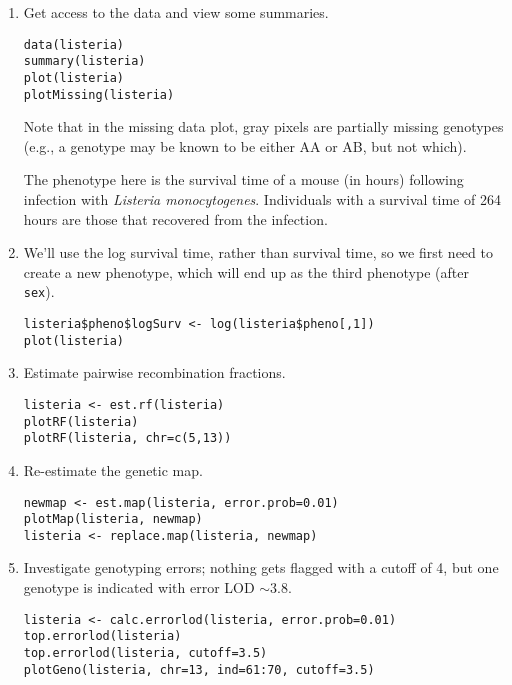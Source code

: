 \documentclass[10pt,letterpaper]{article}
\newcommand{\usercolor}{\color [named]{BlueViolet}}
\begin{document}
\begin{enumerate}
\item Get access to the data and view some summaries.

\usercolor 
\verb|data(listeria)| \\
\verb|summary(listeria)| \\
\verb|plot(listeria)| \\
\verb|plotMissing(listeria)| 
\normalcolor

Note that in the missing data plot, gray pixels are partially missing
genotypes (e.g., a genotype may be known to be either AA or AB, but
not which).

The phenotype here is the survival time of a mouse (in hours)
following infection with \emph{Listeria monocytogenes}.  Individuals
with a survival time of 264 hours are those that recovered from the
infection.

\item We'll use the log survival time, rather than survival time, so
  we first need to create a new phenotype, which will end up as the
  third phenotype (after \verb-sex-).

\usercolor
\verb|listeria$pheno$logSurv <- log(listeria$pheno[,1])| \\ %
\verb|plot(listeria)| \normalcolor

\item Estimate pairwise recombination fractions.

\usercolor \verb|listeria <- est.rf(listeria)| \\
\verb|plotRF(listeria)| \\
\verb|plotRF(listeria, chr=c(5,13))| 
\normalcolor

\item Re-estimate the genetic map. 
 
\usercolor 
\verb|newmap <- est.map(listeria, error.prob=0.01)| \\
\verb|plotMap(listeria, newmap)| \\
\verb|listeria <- replace.map(listeria, newmap)|
\normalcolor

\item Investigate genotyping errors; nothing gets flagged with a
  cutoff of 4, but one genotype is indicated with error LOD
  $\sim$3.8. 

\usercolor 
\verb|listeria <- calc.errorlod(listeria, error.prob=0.01)| \\
\verb|top.errorlod(listeria)| \\
\verb|top.errorlod(listeria, cutoff=3.5)| \\
\verb|plotGeno(listeria, chr=13, ind=61:70, cutoff=3.5)|
\normalcolor


\end{enumerate}
\end{document}
